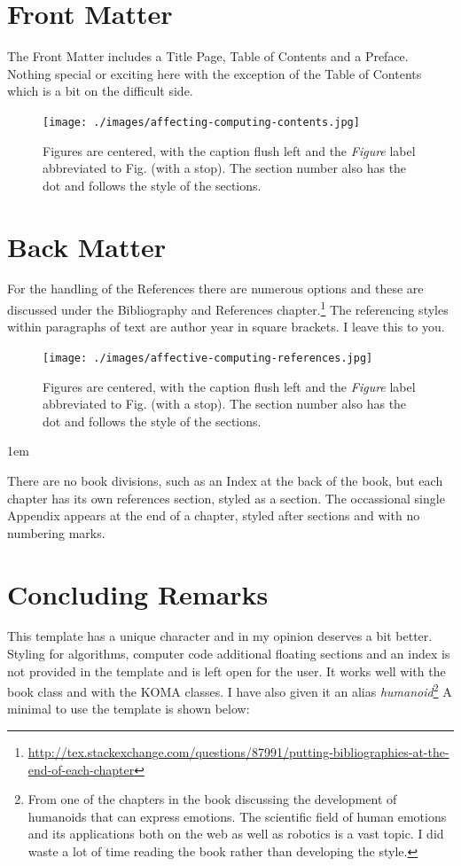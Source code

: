 \section{Front Matter}

The Front Matter includes a Title Page, Table of Contents and a Preface. Nothing special or exciting here with the exception of the Table of Contents which is a bit on the difficult side. 

\begin{figure}[ht]
\centering
\texttt{[image: ./images/affecting-computing-contents.jpg]}
\caption{Figures are centered, with the caption flush left and the \textit{Figure} label abbreviated to Fig. (with a stop). The section number also has the dot and follows the style of the sections.}
\label{fig:eight02}
\end{figure}

\section{Back Matter}



For the handling of the References there are numerous options and these are discussed under the Bibliography and References chapter.\footnote{\protect\url{http://tex.stackexchange.com/questions/87991/putting-bibliographies-at-the-end-of-each-chapter}} The referencing styles within paragraphs of text are author year in square brackets. I leave this to you.

\begin{figure}[ht]
\centering
\texttt{[image: ./images/affective-computing-references.jpg]}
\caption{Figures are centered, with the caption flush left and the \textit{Figure} label abbreviated to Fig. (with a stop). The section number also has the dot and follows the style of the sections.}
\label{fig:eight02}
\end{figure}

\parindent1em

There are no book divisions, such as an Index at the back of the book, but each chapter has its own references section, styled as a section. The occassional single Appendix appears at the end of a chapter, styled after sections and with no numbering marks.

\section{Concluding Remarks}

This template has a unique character and in my opinion deserves a bit better. Styling for algorithms, computer code additional floating sections and an index is not provided in the template and is left open for the user. It works well with the book class and with the KOMA classes. I have also given it an alias \emph{humanoid}\footnote{From one of the chapters in the book discussing the development of humanoids that can express emotions. The scientific field of human emotions and its applications both on the web as well as robotics is a vast topic. I did waste a lot of time reading the book rather than developing the style. } A minimal to use the template is shown below:

